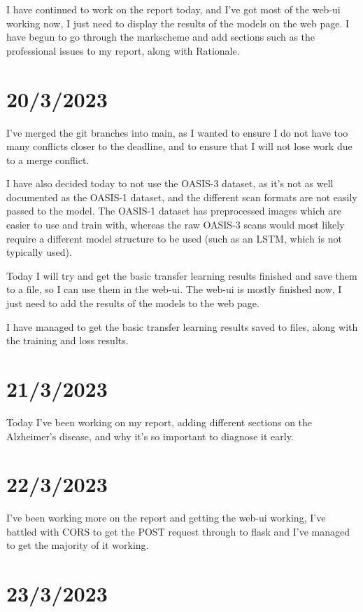 \documentclass[]{final_report}
\begin{document}
I have continued to work on the report today, and I've got most of the web-ui working now, I just need to display the results of the models on the web page. I have begun to go through the markscheme and add sections such as the professional issues to my report, along with Rationale.

\section*{20/3/2023}

I've merged the git branches into main, as I wanted to ensure I do not have too many conflicts closer to the deadline, and to ensure that I will not lose work due to a merge conflict.

I have also decided today to not use the OASIS-3 dataset, as it's not as well documented as the OASIS-1 dataset, and the different scan formats are not easily passed to the model. The OASIS-1 dataset has preprocessed images which are easier to use and train with, whereas the raw OASIS-3 scans would most likely require a different model structure to be used (such as an LSTM, which is not typically used).

Today I will try and get the basic transfer learning results finished and save them to a file, so I can use them in the web-ui.
The web-ui is mostly finished now, I just need to add the results of the models to the web page.

I have managed to get the basic transfer learning results saved to files, along with the training and loss results.

\section*{21/3/2023}

Today I've been working on my report, adding different sections on the Alzheimer's disease, and why it's so important to diagnose it early.

\section*{22/3/2023}

I've been working more on the report and getting the web-ui working, I've battled with CORS to get the POST request through to flask and I've managed to get the majority of it working.

\section*{23/3/2023}
\end{document}
